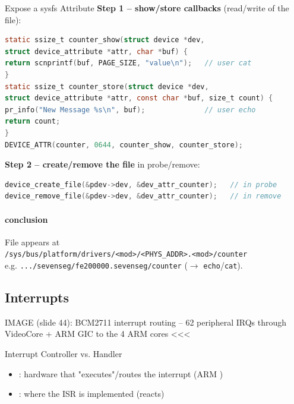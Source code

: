 \begin{KR}{Expose a sysfs Attribute}
    \textbf{Step 1 -- show/store callbacks} (read/write of the file):
\begin{lstlisting}[language=C, style=basesmol, aboveskip=2pt, belowskip=2pt]
static ssize_t counter_show(struct device *dev,
struct device_attribute *attr, char *buf) {
return scnprintf(buf, PAGE_SIZE, "value\n");   // user cat
}
static ssize_t counter_store(struct device *dev,
struct device_attribute *attr, const char *buf, size_t count) {
pr_info("New Message %s\n", buf);              // user echo
return count;
}
DEVICE_ATTR(counter, 0644, counter_show, counter_store);
\end{lstlisting}
    \textbf{Step 2 -- create/remove the file} in probe/remove:
\begin{lstlisting}[language=C, style=basesmol, aboveskip=2pt, belowskip=2pt]
device_create_file(&pdev->dev, &dev_attr_counter);   // in probe
device_remove_file(&pdev->dev, &dev_attr_counter);   // in remove
\end{lstlisting}
    \paragraph{conclusion}
    File appears at\\
    \texttt{/sys/bus/platform/drivers/<mod>/<PHYS\_ADDR>.<mod>/counter}\\
    e.g. \texttt{.../sevenseg/fe200000.sevenseg/counter} ($\to$ \texttt{echo}/\texttt{cat}).
\end{KR}

\raggedcolumns
\columnbreak


\subsection{Interrupts}

IMAGE (slide 44): BCM2711 interrupt routing -- 62 peripheral IRQs through VideoCore + ARM GIC to the 4 ARM cores <<<

\begin{concept}{Interrupt Controller vs. Handler}
    \begin{itemize}
        \item {}: hardware that "executes"/routes the
              interrupt (ARM )
        \item {}: where the ISR is implemented (reacts)
    \end{itemize}
\end{concept}

